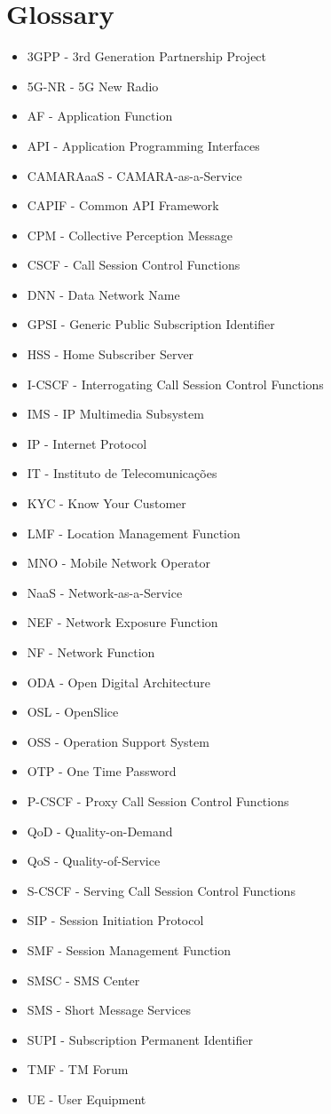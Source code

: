 \chapter*{Glossary}

\begin{itemize}
	\item 3GPP - 3rd Generation Partnership Project
	\item 5G-NR - 5G New Radio
	\item AF - Application Function
	\item API - Application Programming Interfaces
	\item CAMARAaaS - CAMARA-as-a-Service
	\item CAPIF - Common API Framework
	\item CPM - Collective Perception Message
	\item CSCF - Call Session Control Functions
	\item DNN - Data Network Name
	\item GPSI - Generic Public Subscription Identifier
	\item HSS - Home Subscriber Server
	\item I-CSCF - Interrogating Call Session Control Functions
	\item IMS - IP Multimedia Subsystem
	\item IP - Internet Protocol
	\item IT - Instituto de Telecomunicações
	\item KYC - Know Your Customer
	\item LMF - Location Management Function
	\item MNO - Mobile Network Operator
	\item NaaS - Network-as-a-Service
	\item NEF - Network Exposure Function
	\item NF - Network Function
	\item ODA - Open Digital Architecture
	\item OSL - OpenSlice
	\item OSS - Operation Support System
	\item OTP - One Time Password
	\item P-CSCF - Proxy Call Session Control Functions
	\item QoD - Quality-on-Demand
	\item QoS - Quality-of-Service
	\item S-CSCF - Serving Call Session Control Functions
	\item SIP - Session Initiation Protocol
	\item SMF - Session Management Function
	\item SMSC - SMS Center
	\item SMS - Short Message Services
	\item SUPI - Subscription Permanent Identifier
	\item TMF - TM Forum
	\item UE - User Equipment
\end{itemize}
